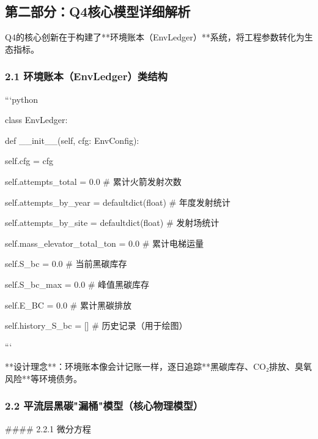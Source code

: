 \documentclass[a4paper,12pt]{article}
\begin{document}
\par
\subsection{第二部分：Q4核心模型详细解析}
Q4的核心创新在于构建了**环境账本（EnvLedger）**系统，将工程参数转化为生态指标。

\par
\subsubsection{2.1 环境账本（EnvLedger）类结构}
```python

\par
class EnvLedger:

\par
def \_\_init\_\_(self, cfg: EnvConfig):

\par
self.cfg = cfg

\par
self.attempts\_total = 0.0          # 累计火箭发射次数

\par
self.attempts\_by\_year = defaultdict(float)  # 年度发射统计

\par
self.attempts\_by\_site = defaultdict(float)  # 发射场统计

\par
self.mass\_elevator\_total\_ton = 0.0  # 累计电梯运量

\par
self.S\_bc = 0.0                    # 当前黑碳库存

\par
self.S\_bc\_max = 0.0                # 峰值黑碳库存

\par
self.E\_BC = 0.0                    # 累计黑碳排放

\par
self.history\_S\_bc = []             # 历史记录（用于绘图）

\par
```

\par
**设计理念**：环境账本像会计记账一样，逐日追踪**黑碳库存、CO₂排放、臭氧风险**等环境债务。

\par
\subsubsection{2.2 平流层黑碳"漏桶"模型（核心物理模型）}
#### 2.2.1 微分方程
\end{document}
